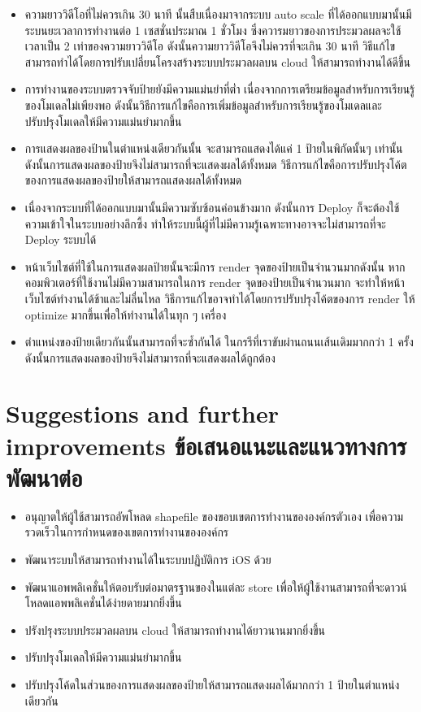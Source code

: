 \begin{itemize}
    \item ความยาววิดีโอที่ไม่ควรเกิน 30 นาที นั้นสืบเนื่องมาจากระบบ auto scale ที่ได้ออกแบบมานั้นมีระบนยะเวลาการทำงานต่อ 1 เซสชั่นประมาณ 1 ชั่วโมง ซึ่งควารมยาวของการประมวลผลจะใช้เวลาเป็น 2 เท่าของความยาววิดีโอ ดังนั้นความยาววิดีโอจึงไม่ควรที่จะเกิน 30 นาที วิธีแก้ไขสามารถทำได้โดยการปรับเปลี่ยนโครงสร้างระบบประมวลผลบน cloud ให้สามารถทำงานได้ดีขึ้น
    \item การทำงานของระบบตรวจจับป้ายยังมีความแม่นยำที่ต่ำ เนื่องจากการเตรียมข้อมูลสำหรับการเรียนรู้ของโมเดลไม่เพียงพอ ดังนั้นวิธีการแก้ไขคือการเพิ่มข้อมูลสำหรับการเรียนรู้ของโมเดลและปรับปรุงโมเดลให้มีความแม่นยำมากขึ้น
    \item การแสดงผลของป้านในตำแหน่งเดียวกันนั้น จะสามารถแสดงได้แค่ 1 ป้ายในพิกัดนั้นๆ เท่านั้น ดังนั้นการแสดงผลของป้ายจึงไม่สามารถที่จะแสดงผลได้ทั้งหมด วิธีการแก้ไขคือการปรับปรุงโค้ตของการแสดงผลของป้ายให้สามารถแสดงผลได้ทั้งหมด
    \item เนื่องจากระบบที่ได้ออกแบบมานั้นมีความซับซ้อนค่อนข้างมาก ดังนั้นการ Deploy ก็จะต้องใช้ความเข้าใจในระบบอย่างลึกซึ้ง ทำให้ระบบนี้ผู้ที่ไม่มีความรู้เฉพาะทางอาจจะไม่สามารถที่จะ Deploy ระบบได้
    \item หน้าเว็บไซต์ที่ใช้ในการแสดงผลป้ายนั้นจะมีการ render จุดของป้ายเป็นจำนวนมากดังนั้น หากคอมพิวเตอร์ที่ใช้งานไม่มีความสามารถในการ render จุดของป้ายเป็นจำนวนมาก จะทำให้หน้าเว็บไซต์ทำงานได้ช้าและไม่ลื่นไหล วิธีการแก้ไขอาจทำได้โดยการปรับปรุงโค้ตของการ render ให้ optimize มากขึ้นเพื่อให้ทำงานได้ในทุก ๆ เครื่อง
    \item ตำแหน่งของป้ายเดียวกันนั้นสามารถที่จะซ้ำกันได้ ในกรรีที่เราขับผ่านถนนเส้นเดิมมากกว่า 1 ครั้ง ดังนั้นการแสดงผลของป้ายจึงไม่สามารถที่จะแสดงผลได้ถูกต้อง 
\end{itemize}

\section{\ifenglish%
Suggestions and further improvements
\else%
ข้อเสนอแนะและแนวทางการพัฒนาต่อ
\fi
}

\begin{itemize}
    \item อนุญาตให้ผู้ใช้สามารถอัพโหลด shapefile ของขอบเขตการทำงานขององค์กรตัวเอง เพื่อความรวดเร็วในการกำหนดของเขตการทำงานขององค์กร
    \item พัฒนาระบบให้สามารถทำงานได้ในระบบปฏิบัติการ iOS ด้วย
    \item พัฒนาแอพพลิเคชั่นให้ตอบรับต่อมาตรฐานของในแต่ละ store เพื่อให้ผู้ใช้งานสามารถที่จะดาวน์โหลดแอพพลิเคชั่นได้ง่ายดายมากยิ่งขึ้น
    \item ปรังปรุงระบบประมวลผลบน cloud ให้สามารถทำงานได้ยาวนานมากยิ่งขึ้น
    \item ปรับปรุงโมเดลให้มีความแม่นยำมากขึ้น
    \item ปรับปรุงโค้ดในส่วนของการแสดงผลของป้ายให้สามารถแสดงผลได้มากกว่า 1 ป้ายในตำแหน่งเดียวกัน
\end{itemize}